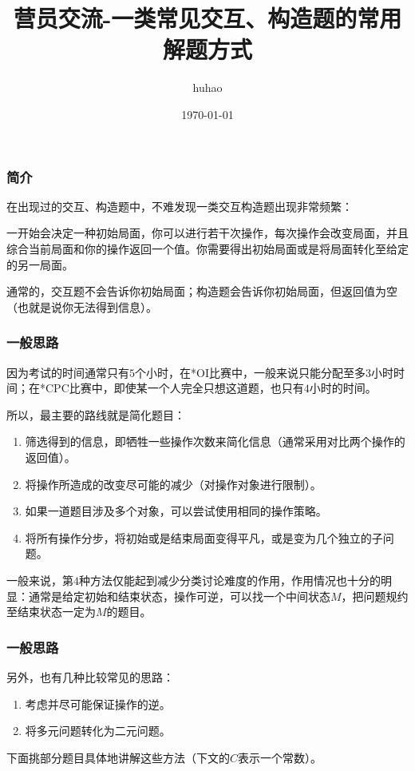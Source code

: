 \documentclass[10pt]{beamer}
\begin{document}
	\title{营员交流-一类常见交互、构造题的常用解题方式}
	\date{\today}
	\author{huhao}
	\maketitle
	\clearpage
	\begin{frame}
		\frametitle{简介}

		在出现过的交互、构造题中，不难发现一类交互构造题出现非常频繁：

		一开始会决定一种初始局面，你可以进行若干次操作，每次操作会改变局面，并且综合当前局面和你的操作返回一个值。你需要得出初始局面或是将局面转化至给定的另一局面。

		通常的，交互题不会告诉你初始局面；构造题会告诉你初始局面，但返回值为空（也就是说你无法得到信息）。
		
	\end{frame}
	\clearpage
	\begin{frame}
		\frametitle{一般思路}
	
		因为考试的时间通常只有$5$个小时，在*OI比赛中，一般来说只能分配至多$3$小时时间；在*CPC比赛中，即使某一个人完全只想这道题，也只有$4$小时的时间。

		所以，最主要的路线就是简化题目：

		\begin{enumerate}
			\item 筛选得到的信息，即牺牲一些操作次数来简化信息（通常采用对比两个操作的返回值）。
			\item 将操作所造成的改变尽可能的减少（对操作对象进行限制）。
			\item 如果一道题目涉及多个对象，可以尝试使用相同的操作策略。
			\item 将所有操作分步，将初始或是结束局面变得平凡，或是变为几个独立的子问题。
		\end{enumerate}

		一般来说，第$4$种方法仅能起到减少分类讨论难度的作用，作用情况也十分的明显：通常是给定初始和结束状态，操作可逆，可以找一个中间状态$M$，把问题规约至结束状态一定为$M$的题目。
	\end{frame}
	\clearpage
	\begin{frame}
		\frametitle{一般思路}
	
		另外，也有几种比较常见的思路：

		\begin{enumerate}
			\item 考虑并尽可能保证操作的逆。
			\item 将多元问题转化为二元问题。
		\end{enumerate}

		下面挑部分题目具体地讲解这些方法（下文的$C$表示一个常数）。
	
	\end{frame}
\end{document}
